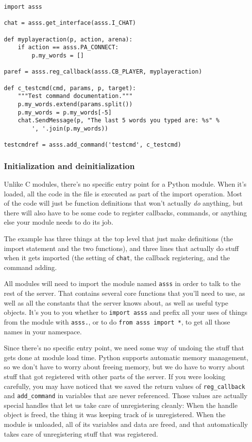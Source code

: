 \documentclass{article}
\begin{document}
\begin{verbatim}
import asss

chat = asss.get_interface(asss.I_CHAT)

def myplayeraction(p, action, arena):
    if action == asss.PA_CONNECT:
        p.my_words = []

paref = asss.reg_callback(asss.CB_PLAYER, myplayeraction)

def c_testcmd(cmd, params, p, target):
    """Test command documentation."""
    p.my_words.extend(params.split())
    p.my_words = p.my_words[-5]
    chat.SendMessage(p, "The last 5 words you typed are: %s" %
        ', '.join(p.my_words))

testcmdref = asss.add_command('testcmd', c_testcmd)
\end{verbatim}


\subsubsection{Initialization and deinitialization}

Unlike C modules, there's no specific entry point for a Python module.
When it's loaded, all the code in the file is executed as part of the
import operation. Most of the code will just be function definitions
that won't actually \emph{do} anything, but there will also have to be
some code to register callbacks, commands, or anything else your module
needs to do its job.

The example has three things at the top level that just make definitions
(the import statement and the two functions), and three lines that
actually do stuff when it gets imported (the setting of \verb/chat/, the
callback registering, and the command adding.

All modules will need to import the module named \verb/asss/ in order to
talk to the rest of the server. That contains several core functions
that you'll need to use, as well as all the constants that the server
knows about, as well as useful type objects. It's you to you whether to
\verb/import asss/ and prefix all your uses of things from the module
with \verb/asss./, or to do \verb/from asss import */, to get all those
names in your namespace.

Since there's no specific entry point, we need some way of undoing the
stuff that gets done at module load time. Python supports automatic
memory management, so we don't have to worry about freeing memory, but
we do have to worry about stuff that got registered with other parts of
the server. If you were looking carefully, you may have noticed that we
saved the return values of \verb/reg_callback/ and \verb/add_command/ in
variables that are never referenced. Those values are actually special
handles that let us take care of unregistering cleanly: When the handle
object is freed, the thing it was keeping track of is unregistered. When
the module is unloaded, all of its variables and data are freed, and
that automatically takes care of unregistering stuff that was
registered.
\end{document}
